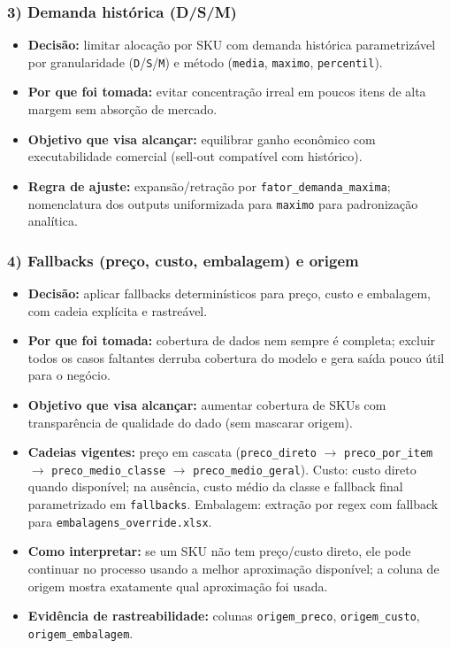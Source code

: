 \documentclass[11pt,a4paper]{article}
\begin{document}
\subsubsection*{3) Demanda histórica (D/S/M)}
\begin{itemize}
    \item \textbf{Decisão:} limitar alocação por SKU com demanda histórica
    parametrizável por granularidade (\texttt{D}/\texttt{S}/\texttt{M}) e
    método (\texttt{media}, \texttt{maximo}, \texttt{percentil}).
    \item \textbf{Por que foi tomada:} evitar concentração irreal em poucos
    itens de alta margem sem absorção de mercado.
    \item \textbf{Objetivo que visa alcançar:} equilibrar ganho econômico com
    executabilidade comercial (sell-out compatível com histórico).
    \item \textbf{Regra de ajuste:} expansão/retração por
    \texttt{fator\_demanda\_maxima}; nomenclatura dos outputs uniformizada para
    \texttt{maximo} para padronização analítica.
\end{itemize}

\subsubsection*{4) Fallbacks (preço, custo, embalagem) e origem}
\begin{itemize}
    \item \textbf{Decisão:} aplicar fallbacks determinísticos para preço, custo
    e embalagem, com cadeia explícita e rastreável.
    \item \textbf{Por que foi tomada:} cobertura de dados nem sempre é completa;
    excluir todos os casos faltantes derruba cobertura do modelo e gera saída
    pouco útil para o negócio.
    \item \textbf{Objetivo que visa alcançar:} aumentar cobertura de SKUs com
    transparência de qualidade do dado (sem mascarar origem).
    \item \textbf{Cadeias vigentes:} preço em cascata
    (\texttt{preco\_direto} $\rightarrow$ \texttt{preco\_por\_item}
    $\rightarrow$ \texttt{preco\_medio\_classe}
    $\rightarrow$ \texttt{preco\_medio\_geral}).
    Custo: custo direto quando disponível; na ausência, custo médio da
    classe e fallback final parametrizado em \texttt{fallbacks}.
    Embalagem: extração por regex com fallback para
    \texttt{embalagens\_override.xlsx}.
    \item \textbf{Como interpretar:} se um SKU não tem preço/custo direto,
    ele pode continuar no processo usando a melhor aproximação disponível;
    a coluna de origem mostra exatamente qual aproximação foi usada.
    \item \textbf{Evidência de rastreabilidade:} colunas
    \texttt{origem\_preco}, \texttt{origem\_custo},
    \texttt{origem\_embalagem}.
\end{itemize}
\end{document}

